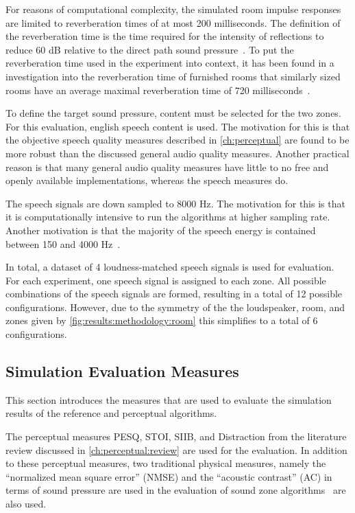 For reasons of computational complexity, the simulated room impulse 
responses are limited to reverberation times of at most 200 milliseconds.
The definition of the reverberation time is the time required for the intensity of reflections to reduce 60 dB relative 
to the direct path sound pressure~\cite{habets2006room}. 
To put the reverberation time used in the experiment into context, 
it has been found in a investigation into the reverberation time of furnished rooms
that similarly sized rooms have an average maximal reverberation 
time of 720 milliseconds~\cite{diaz2005reverberation}.

To define the target sound pressure, content must be selected for the two zones.
For this evaluation, english speech content is used.
The motivation for this is that the objective speech quality measures described in 
\autoref{ch:perceptual} are found to be more robust than
the discussed general audio quality measures.
Another practical reason is that many general audio quality measures have 
little to no free and openly available implementations, whereas the speech measures do.

The speech signals are down sampled to 8000 Hz.
The motivation for this is that it is computationally intensive to run the algorithms at higher sampling rate.
Another motivation is that the majority of the speech energy is contained between 150 and 4000 Hz~\cite{etsi2010}.

In total, a dataset of 4 loudness-matched speech signals is used for evaluation.
For each experiment, one speech signal is assigned to each zone.
All possible combinations of the speech signals are formed, resulting in a total of 12 possible configurations.
However, due to the symmetry of the the loudspeaker, room, and zones given by \autoref{fig:results:methodology:room} this simplifies to 
a total of 6 configurations.

\subsection{Simulation Evaluation Measures}
\label{ch:results:methodology:measures}
This section introduces the measures that are used to evaluate the simulation results 
of the reference and perceptual algorithms.

The perceptual measures PESQ, STOI, SIIB, and Distraction 
from the literature review discussed in \autoref{ch:perceptual:review} are used for the evaluation.
In addition to these perceptual measures, two traditional physical measures, namely the ``normalized mean square error'' (NMSE) and
the ``acoustic contrast'' (AC) in terms of sound pressure are used in the evaluation of 
sound zone algorithms~\cite{lee2018unified} are also used.

